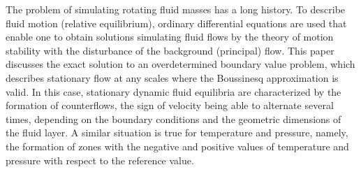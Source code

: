 \smallskip




The problem of simulating rotating fluid masses has a long history. To describe fluid motion (relative equilibrium), ordinary differential equa\-tions are used that enable one to obtain solutions simulating fluid flows by the theory of motion stability with the disturbance of the background (principal) flow. This paper discusses the exact solution to an overdetermined boundary value problem, which describes stationary flow at any scales where the Boussinesq approximation is valid. In this case, stationary dynamic fluid equilibria are chara\-cterized by the formation of counterflows, the sign of velocity being able to alternate several times, depending on the boundary conditions and the geometric dimensions of the fluid layer. A similar situation is true for temperature and pressure, namely, the formation of zones with the negative and positive values of temperature and pressure with respect to the reference value. 



\smallskip 

 



















